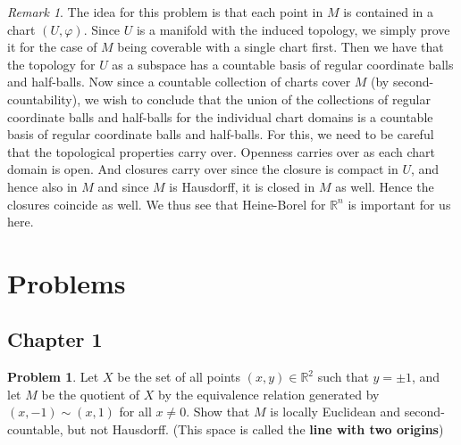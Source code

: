 \documentclass[reqno]{amsart}
\theoremstyle{plain}%
\theoremstyle{definition}
\newtheorem{problem}[theorem]{Problem}
\theoremstyle{remark}
\newtheorem*{remark}{Remark}
\begin{document}
        \begin{remark}
            The idea for this problem is that each point in
            $M$ is contained in a chart $\left( U, \varphi \right) $.
            Since $U$ is a manifold with the induced topology, 
            we simply prove it for the case of $M$ being coverable
            with a single chart first. Then we have that
            the topology for $U$ as a subspace has a countable
            basis of regular coordinate balls and half-balls.
            Now since a countable collection of charts
            cover $M$ (by second-countability), we wish to
            conclude that the union of the collections of
            regular coordinate balls and half-balls for the individual
            chart domains is a countable basis of regular coordinate
            balls and half-balls. For this, we need to be careful
            that the topological properties carry over. 
            Openness carries over as each chart domain is open.
            And closures carry over since the closure is
            compact in $U$, and hence also in $M$ and since
            $M$ is Hausdorff, it is closed in $M$ as well. 
            Hence the closures coincide as well. We thus see
            that Heine-Borel for $\mathbb{R}^{n}$ is important
            for us here.
        \end{remark}

    \section*{Problems}

    \subsection{Chapter 1}
    \begin{problem}
        Let $X$ be the set of all points
        $(x,y) \in \mathbb{R}^2$ such that
        $y = \pm 1$, and let $M$ be the quotient of
        $X$ by the equivalence relation generated
        by $\left( x,-1 \right) \sim \left( x,1 \right) $ 
        for all $x\neq 0$. Show that $M$ is locally Euclidean
        and second-countable, but not Hausdorff.
        (This space is called the \textbf{line with two
        origins})
    \end{problem}
\end{document}
